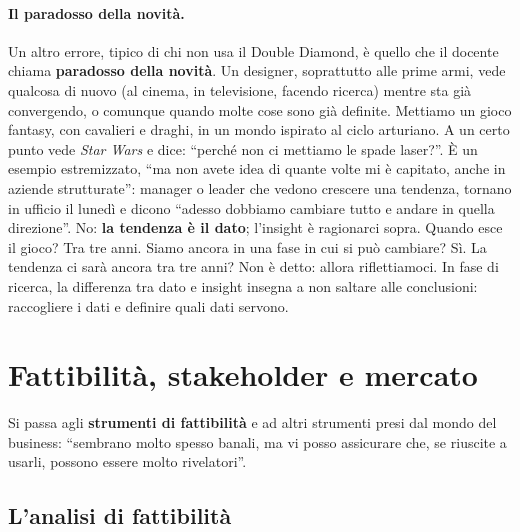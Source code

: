 \paragraph{Il paradosso della novità.} Un altro errore, tipico di chi non usa il Double
Diamond, è quello che il docente chiama \textbf{paradosso della novità}. Un designer,
soprattutto alle prime armi, vede qualcosa di nuovo (al cinema, in televisione, facendo
ricerca) mentre sta già convergendo, o comunque quando molte cose sono già definite.
Mettiamo un gioco fantasy, con cavalieri e draghi, in un mondo ispirato al ciclo
arturiano. A un certo punto vede \emph{Star Wars} e dice: ``perché non ci mettiamo le
spade laser?''. È un esempio estremizzato, ``ma non avete idea di quante volte mi è
capitato, anche in aziende strutturate'': manager o leader che vedono crescere una
tendenza, tornano in ufficio il lunedì e dicono ``adesso dobbiamo cambiare tutto e andare
in quella direzione''. No: \textbf{la tendenza è il dato}; l'insight è ragionarci sopra.
Quando esce il gioco? Tra tre anni. Siamo ancora in una fase in cui si può cambiare? Sì.
La tendenza ci sarà ancora tra tre anni? Non è detto: allora riflettiamoci. In fase di
ricerca, la differenza tra dato e insight insegna a non saltare alle conclusioni:
raccogliere i dati e definire quali dati servono.

\section{Fattibilità, stakeholder e mercato}
\label{a5:sec:fattibilita}

Si passa agli \textbf{strumenti di fattibilità} e ad altri strumenti presi dal mondo del
business: ``sembrano molto spesso banali, ma vi posso assicurare che, se riuscite a
usarli, possono essere molto rivelatori''.

\subsection{L'analisi di fattibilità}




